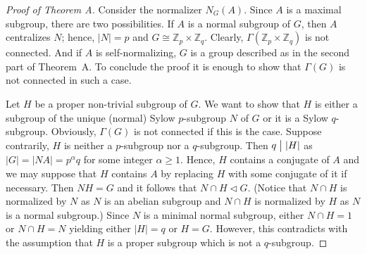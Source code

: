 \documentclass[a4paper,12pt]{article}
\theoremstyle{definition}
\theoremstyle{remark}
\theoremstyle{theorem}
\newcommand{\divides}{\bigm|}
\begin{document}
\begin{proof}[Proof of Theorem A]

Consider the normalizer $N_G(A)$. Since $A$ is a maximal subgroup, there are two possibilities. If $A$ is a normal subgroup of $G$, then $A$ centralizes $N$; hence, $|N|=p$ and $G\cong\mathbb{Z}_p\times\mathbb{Z}_q$. Clearly, $\Gamma(\mathbb{Z}_p\times\mathbb{Z}_q)$ is not connected. And if $A$ is self-normalizing, $G$ is a group described as in the second part of Theorem~A.
To conclude the proof it is enough to show that $\Gamma(G)$ is not connected in such a case.

Let $H$ be a proper non-trivial subgroup of $G$. We want to show that $H$ is either a subgroup of the unique (normal) Sylow $p$-subgroup $N$ of $G$ or it is a Sylow $q$-subgroup. Obviously, $\Gamma(G)$ is not connected if this is the case. Suppose contrarily, $H$ is neither a $p$-subgroup nor a $q$-subgroup. Then $q\divides |H|$ as $|G|=|NA|=p^{\alpha}q$ for some integer $\alpha\geq 1$. Hence, $H$ contains a conjugate of $A$ and we may suppose that $H$ contains $A$ by replacing $H$ with some conjugate of it if necessary. Then $NH=G$ and it follows that $N\cap H\triangleleft G$. (Notice that $N\cap H$ is normalized by $N$ as $N$ is an abelian subgroup and $N\cap H$ is normalized by $H$ as $N$ is a normal subgroup.) Since $N$ is a minimal normal subgroup, either $N\cap H=1$ or $N\cap H=N$ yielding either $|H|=q$ or $H=G$. However, this contradicts with the assumption that $H$ is a proper subgroup which is not a $q$-subgroup. 

\end{proof}
\end{document}
